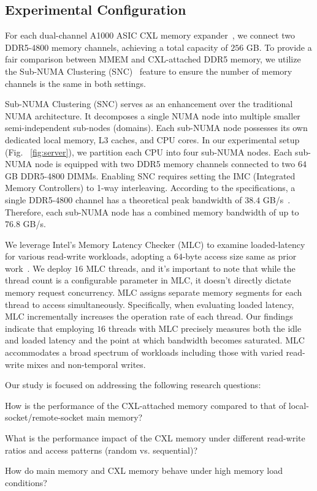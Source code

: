 \subsection{Experimental Configuration}
\label{ssec:config}
For each dual-channel A1000 ASIC CXL memory expander~\cite{A1000}, we connect two DDR5-4800 memory channels, achieving a total capacity of $256$ GB. To provide a fair comparison between MMEM and CXL-attached DDR5 memory, we utilize the Sub-NUMA Clustering (SNC)~\cite{snc} feature to ensure the number of memory channels is the same in both settings. 

 Sub-NUMA Clustering (SNC) serves as an enhancement over the traditional NUMA architecture. It decomposes a single NUMA node into multiple smaller semi-independent sub-nodes (domains). Each sub-NUMA node possesses its own dedicated local memory, L3 caches, and CPU cores. In our experimental setup (Fig. ~\ref{fig:server}), we partition each CPU into four sub-NUMA nodes. Each sub-NUMA node is equipped with two DDR5 memory channels connected to two $64$ GB DDR5-4800 DIMMs. Enabling SNC requires setting the IMC (Integrated Memory Controllers) to 1-way interleaving. According to the specifications, a single DDR5-4800 channel has a theoretical peak bandwidth of $38.4$ GB/s~\cite{cxlcentric}. Therefore, each sub-NUMA node has a combined memory bandwidth of up to $76.8$ GB/s.

 We leverage Intel's Memory Latency Checker (MLC) to examine loaded-latency for various read-write workloads, adopting a $64$-byte access size same as prior work~\cite{demystify}. We deploy $16$ MLC threads, and it's important to note that while the thread count is a configurable parameter in MLC, it doesn't directly dictate memory request concurrency. MLC assigns separate memory segments for each thread to access simultaneously. Specifically, when evaluating loaded latency, MLC incrementally increases the operation rate of each thread. Our findings indicate that employing $16$ threads with MLC precisely measures both the idle and loaded latency and the point at which bandwidth becomes saturated. MLC accommodates a broad spectrum of workloads including those with varied read-write mixes and non-temporal writes.

Our study is focused on addressing the following research questions:

\begin{icompact}
    \item How is the performance of the CXL-attached memory compared to that of local-socket/remote-socket main memory?
    \item What is the performance impact of the CXL memory under different read-write ratios and access patterns (random vs. sequential)?
    \item How do main memory and CXL memory behave under high memory load conditions?
\end{icompact}


